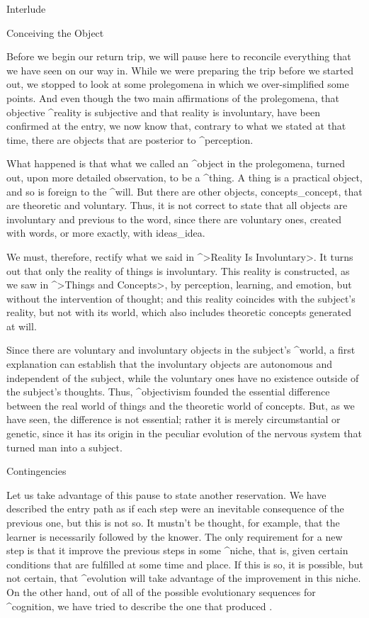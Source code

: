
\Part Interlude

\Section Conceiving the Object

Before we begin our return trip, we will pause here to reconcile
everything that we have seen on our way in. While we were preparing the
trip before we started out, we stopped to look at some prolegomena in
which we over-simplified some points. And even though the two main
affirmations of the prolegomena, that objective ^{reality} is subjective
and that reality is involuntary, have been confirmed at the entry, we
now know that, contrary to what we stated at that time, there are
objects that are posterior to ^{perception}.

What happened is that what we called an ^{object} in the prolegomena,
turned out, upon more detailed observation, to be a ^{thing}. A thing is
a practical object, and so is foreign to the ^{will}. But there are
other objects, concepts_{concept}, that are theoretic and voluntary.
Thus, it is not correct to state that all objects are involuntary and
previous to the word, since there are voluntary ones, created with
words, or more exactly, with ideas_{idea}.

We must, therefore, rectify what we said in ^>Reality Is Involuntary>.
It turns out that only the reality of things is involuntary. This
reality is constructed, as we saw in ^>Things and Concepts>, by
perception, learning, and emotion, but without the intervention of
thought; and this reality coincides with the subject's reality, but not
with its world, which also includes theoretic concepts generated at
will.

Since there are voluntary and involuntary objects in the subject's
^{world}, a first explanation can establish that the involuntary objects
are autonomous and independent of the subject, while the voluntary ones
have no existence outside of the subject's thoughts. Thus,
^{objectivism} founded the essential difference between the real world
of things and the theoretic world of concepts. But, as we have seen, the
difference is not essential; rather it is merely circumstantial or
genetic, since it has its origin in the peculiar evolution of the
nervous system that turned man into a subject.


\Section Contingencies

Let us take advantage of this pause to state another reservation. We
have described the entry path as if each step were an inevitable
consequence of the previous one, but this is not so. It mustn't be
thought, for example, that the learner is necessarily followed by the
knower. The only requirement for a new step is that it improve the
previous steps in some ^{niche}, that is, given certain conditions that
are fulfilled at some time and place. If this is so, it is possible, but
not certain, that ^{evolution} will take advantage of the improvement in
this niche. On the other hand, out of all of the possible evolutionary
sequences for ^{cognition}, we have tried to describe the one that
produced .

